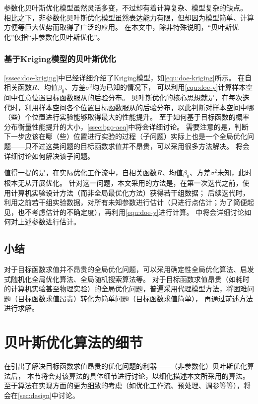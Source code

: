 \documentclass[index]{subfiles}
\begin{document}
参数化贝叶斯优化模型虽然灵活多变，不过却有着计算复杂、模型复杂的缺点。
相比之下，非参数化贝叶斯优化模型虽然表达能力有限，但却因为模型简单、计算方便等巨大优势而取得了广泛的应用。
在本文中，除非特殊说明，“贝叶斯优化”仅指“非参数化贝叶斯优化”。

\subsubsection{基于Kriging模型的贝叶斯优化}
\cref{sssec:doe-kriging}中已经详细介绍了Kriging模型，如\cref{equ:doe-kriging}所示。
在自相关函数$R$、均值$\beta_0$、方差$\sigma^2$均为已知的情况下，
可以利用\cref{equ:doe-y}计算样本空间中任意位置目标函数服从的后验分布。
贝叶斯优化的核心思想就是，在每次迭代时，利用样本空间各个位置目标函数服从的后验分布，以此判断对样本空间中哪（些）个位置进行实验能够取得最大的性能提升。
至于如何基于目标函数的概率分布衡量性能提升的大小，\cref{ssec:bgo-acq}中将会详细讨论。
需要注意的是，判断下一步应该在哪（些）位置进行实验的过程（子问题）实际上也是一个全局优化问题——只不过这类问题的目标函数求值并不昂贵，可以采用很多方法解决。
将会详细讨论如何解决该子问题。\cite{shahriari2016}

值得一提的是，在实际优化工作流中，自相关函数$R$、均值$\beta_0$、方差$\sigma^2$未知，此时根本无从开展优化。
针对这一问题，本文采用的方法是，在第一次迭代之前，使用计算机实验设计方法（而非全局最优化方法）获得若干组数据；
后续迭代时，利用之前若干组实验数据，对所有未知参数进行估计（只进行点估计；为了简便起见，也不考虑估计的不确定度），再利用\cref{equ:doe-y}进行计算。
中将会详细讨论如何对上述参数进行估计。

\subsection{小结}
对于目标函数求值并不昂贵的全局优化问题，可以采用确定性全局优化算法、启发式随机化全局优化算法、全局随机搜索算法等。
对于目标函数求值昂贵（如耗时的计算机实验甚至物理实验）的全局优化问题，普遍采用代理模型方法，将困难问题（目标函数求值昂贵）转化为简单问题（目标函数求值简单），
再通过前述方法进行求解。

\section{贝叶斯优化算法的细节}\label{ssec:bgo}
在引出了解决目标函数求值昂贵的优化问题的利器——（非参数化）贝叶斯优化算法后，
本节将会对该算法的具体细节进行讨论，以细化描述本文所采用的算法。
至于算法在实现方面的更为细致的考虑（如优化工作流、预处理、调参等等），将会在\cref{sec:design}中讨论。
\end{document}
